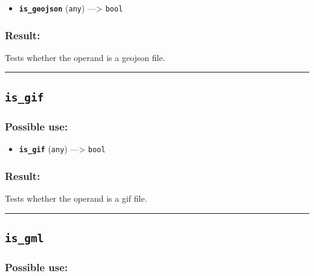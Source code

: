 \documentclass[]{book}
\providecommand{\tightlist}{%
  \setlength{\itemsep}{0pt}\setlength{\parskip}{0pt}}
\theoremstyle{definition}
\theoremstyle{definition}
\theoremstyle{definition}
\theoremstyle{remark}
\begin{document}
\begin{itemize}
\tightlist
\item
  \textbf{\texttt{is\_geojson}} (\texttt{any}) ---\textgreater{}
  \texttt{bool}
\end{itemize}

\subsubsection{Result:}\label{result-280}

Tests whether the operand is a geojson file.

\begin{center}\rule{0.5\linewidth}{\linethickness}\end{center}

\subsection{\texorpdfstring{\texttt{is\_gif}}{is\_gif}}\label{is_gif}

\subsubsection{Possible use:}\label{possible-use-291}

\begin{itemize}
\tightlist
\item
  \textbf{\texttt{is\_gif}} (\texttt{any}) ---\textgreater{}
  \texttt{bool}
\end{itemize}

\subsubsection{Result:}\label{result-281}

Tests whether the operand is a gif file.

\begin{center}\rule{0.5\linewidth}{\linethickness}\end{center}

\subsection{\texorpdfstring{\texttt{is\_gml}}{is\_gml}}\label{is_gml}

\subsubsection{Possible use:}\label{possible-use-292}
\end{document}
